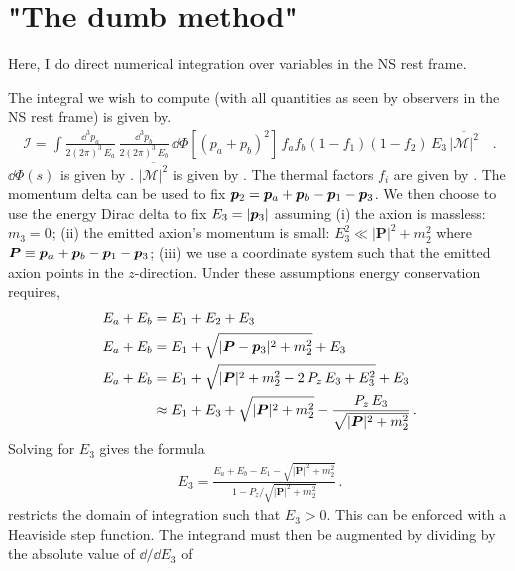 \section{"The dumb method"}
Here, I do direct numerical integration over variables in the NS rest frame.

The integral we wish to compute (with all quantities as seen by observers in the NS rest frame) is given by.
\begin{align}
    \mathcal{I} = 
       \int \frac{\dd^3 p_a}{2(2\pi)^3\, E_a} 
    \, \frac{\dd^3 p_b}{2(2\pi)^3\, E_b} 
    \, \dd \Phi[(p_a + p_b)^2]
    \, f_a f_b (1 - f_1) (1 - f_2)
    \, E_3
    \, \overline{|\mathcal{M}|^2} \quad .
\end{align}
$\dd \Phi(s)$ is given by . $\overline{|\mathcal{M}|^2}$ is given by . The thermal factors $f_i$ are given by . The momentum delta can be used to fix $\pvec[2] = \pvec[a] + \pvec[b] - \pvec[1] - \pvec[3]$. 
We then choose to use the energy Dirac delta to fix $E_3 = |\pvec[3]|$ assuming (i) the axion is massless: $m_3 = 0$; (ii) the emitted axion's momentum is small: $E_3^2 \ll |\bm{P}|^2 + m_2^2$ where $\bm{P} \equiv \pvec[a] + \pvec[b] - \pvec[1] - \pvec[3]$; (iii) we use a coordinate system such that the emitted axion points in the $z$-direction. 
Under these assumptions energy conservation requires,
\begin{align}
    E_a + E_b &= E_1 + E_2 + E_3 \\
    E_a + E_b &= E_1 + \sqrt{|\bm{P} - \pvec[3]|^2 + m_2^2} + E_3 \\
    \label{eq:dumb-method-energy-conservation}
    E_a + E_b &= E_1 +
        \sqrt{|\bm{P}|^2 + m_2^2 -
            2 \, P_z \, E_3 + E_3^2
            }  +
        E_3 \\
    &\approx
        E_1 + E_3 + \sqrt{|\bm{P}|^2 + m_2^2} -
        \frac{P_z \, E_3}{\sqrt{|\bm{P}|^2 + m_2^2}} \, .
\end{align}
Solving for $E_3$ gives the formula
\begin{align}
    \label{eq:pmag3-formula}
    E_3 = \frac{E_a + E_b - E_1 - \sqrt{|\bm{P}|^2 + m_2^2}}{1 - P_z / \sqrt{|\bm{P}|^2 + m_2^2}} \, .
\end{align}
 restricts the domain of integration such that $E_3 > 0$. 
This can be enforced with a Heaviside step function. 
The integrand must then be augmented by dividing by the absolute value of $\dd / \dd E_3$ of 
